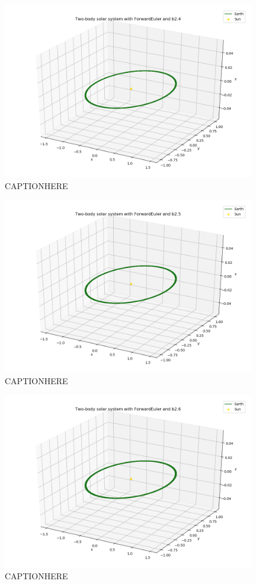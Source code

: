 \documentclass{article}
\begin{document}
    \begin{figure}[H]
        \centering
        \includegraphics[width = 11cm]{img/plot3D_S_E_F_b24.png}
        \caption{CAPTIONHERE}
        \label{fig:plot3D_S_E_F_b24}
    \end{figure}

    \begin{figure}[H]
        \centering
        \includegraphics[width = 11cm]{img/plot3D_S_E_F_b25.png}
        \caption{CAPTIONHERE}
        \label{fig:plot3D_S_E_F_b25}
    \end{figure}

    \begin{figure}[H]
        \centering
        \includegraphics[width = 11cm]{img/plot3D_S_E_F_b26.png}
        \caption{CAPTIONHERE}
        \label{fig:plot3D_S_E_F_b26}
    \end{figure}
\end{document}
